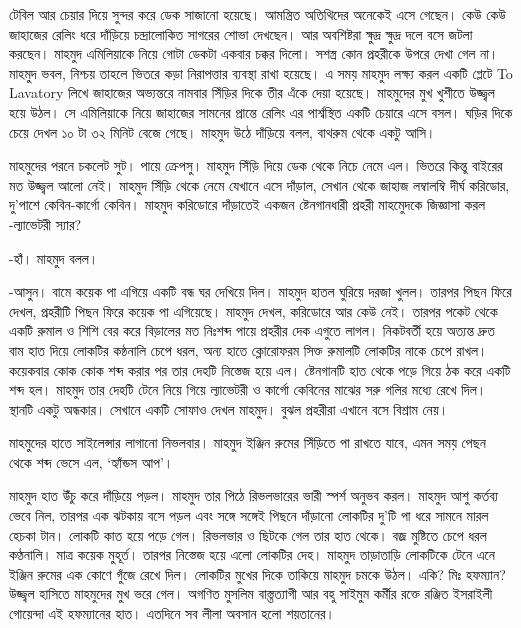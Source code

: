 \documentclass[
]{book}
\begin{document}
টেবিল আর চেয়ার দিয়ে সুন্দর করে ডেক সাজানো হয়েছে। আমন্ত্রিত অতিথিদের অনেকেই এসে গেছেন। কেউ কেউ জাহাজের রেলিং ধরে দাঁড়িয়ে চন্দ্রালোকিত সাগরের শোভা দেখছেন। আর অবশিষ্টরা ক্ষুদ্র ক্ষুদ্র দলে বসে জটলা করছেন। মাহমুদ এমিলিয়াকে নিয়ে গোটা ডেকটা একবার চক্কর দিলো। সশস্ত্র কোন প্রহরীকে উপরে দেখা গেল না। মাহমুদ ভবল, নিশ্চয় তাহলে ভিতরে কড়া নিরাপত্তার ব্যবস্থা রাখা হয়েছে। এ সময় মাহমুদ লক্ষ্য করল একটি প্লেটে To Lavatory লিখে জাহাজের অভ্যন্তরে নামবার সিঁড়ির দিকে তীর এঁকে দেয়া হয়েছে। মাহমুদের মুখ খুশীতে উজ্জ্বল হয়ে উঠল। সে এমিলিয়াকে নিয়ে জাহাজের সামনের প্রান্তে রেলিং এর পার্শ্বস্থিত একটি চেয়ারে এসে বসল। ঘড়ির দিকে চেয়ে দেখল ১০ টা ৩২ মিনিট বেজে গেছে। মাহমুদ উঠে দাঁড়িয়ে বলল, বাথরুম থেকে একটু আসি।

মাহমুদের পরনে চকলেট সুট। পায়ে ক্রেপসু। মাহমুদ সিঁড়ি দিয়ে ডেক থেকে নিচে নেমে এল। ভিতরে কিন্তু বাইরের মত উজ্জ্বল আলো নেই। মাহমুদ সিঁড়ি থেকে নেমে যেখানে এসে দাঁড়াল, সেখান থেকে জাহাজ লম্বালম্বি দীর্ঘ করিডোর, দু'পাশে কেবিন-কার্গো কেবিন। মাহমুদ করিডোরে দাঁড়াতেই একজন ষ্টেনগানধারী প্রহরী মাহমেুদকে জিজ্ঞাসা করল -ল্যাভেটরী স্যার?

-হাঁ। মাহমুদ বলল।

-আসুন। বামে কয়েক পা এগিয়ে একটি বন্ধ ঘর দেখিয়ে দিল। মাহমুদ হাতল ঘুরিয়ে দরজা খুলল। তারপর পিছন ফিরে দেখল, প্রহরীটি পিছন ফিরে কয়েক পা এগিয়েছে। মাহমুদ দেখল, করিডোরে আর কেউ নেই। তারপর পকেট থেকে একটি রুমাল ও শিশি বের করে বিড়ালের মত নিঃশব্দ পায়ে প্রহরীর দেক এগুতে লাগল। নিকটবর্তী হয়ে অত্যন্ত দ্রুত বাম হাত দিয়ে লোকটির কন্ঠনালি চেপে ধরল, অন্য হাতে ক্লোরোফরম সিক্ত রুমালটি লোকটির নাকে চেপে রাখল। কয়েকবার কোক কোক শব্দ করার পর তার দেহটি নিস্তেজ হয়ে এল। ষ্টেনগানটি হাত থেকে পড়ে গিয়ে ঠক করে একটি শব্দ হল। মাহমুদ তার দেহটি টেনে নিয়ে গিয়ে ল্যাভেটরী ও কার্গো কেবিনের মাঝের সরু গলির মধ্যে রেখে দিল। স্থানটি একটু অন্ধকার। সেখানে একটি সোফাও দেখল মাহমুদ। বুঝল প্রহরীরা এখানে বসে বিশ্রাম নেয়।

মাহমুদের হাতে সাইলেন্সার লাগানো নিভলবার। মাহমুদ ইঞ্জিন রুমের সিঁড়িতে পা রাখতে যাবে, এমন সময় পেছন থেকে শব্দ ভেসে এল, `হ্যাঁন্ডস আপ'।

মাহমুদ হাত উঁচু করে দাঁড়িয়ে পড়ল। মাহমুদ তার পিঠে রিভলভারের ভারী স্পর্শ অনুভব করল। মাহমুদ আশু কর্তব্য ভেবে নিল, তারপর এক ঝটকায় বসে পড়ল এবং সঙ্গে সঙ্গেই পিছনে দাঁড়ানো লোকটির দু'টি পা ধরে সামনে মারল হেচকা টান। লোকটি কাত হয়ে পড়ে গেল। রিভলভার ও ছিটকে গেল তার হাত থেকে। বজ্র মুষ্টিতে চেপে ধরল কণ্ঠনালি। মাত্র কয়েক মুহূর্ত। তারপর নিস্তেজ হয়ে এলো লোকটির দেহ। মাহমুদ তাড়াতাড়ি লোকটিকে টেনে এনে ইঞ্জিন রুমের এক কোণে গুঁজে রেখে দিল। লোকটির মুখের দিকে তাকিয়ে মাহমুদ চমকে উঠল। একি? মিঃ হফম্যান? উজ্জ্বল হাসিতে মাহমুদের মুখ ভরে গেল। অগণিত মুসলিম বাস্ত্তত্যাগী আর বহু সাইমুম কর্মীর রক্তে রঞ্জিত ইসরাইলী গোয়েন্দা এই হফম্যানের হাত। এতদিনে সব লীলা অবসান হলো শয়তানের।
\end{document}
